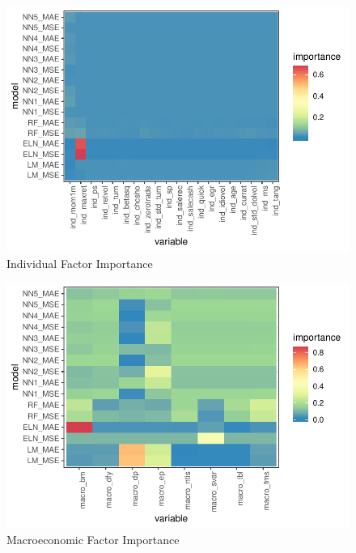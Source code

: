 \documentclass[11pt, a4paper, table]{article}
\begin{document}
\begin{figure}
	\includegraphics[]{../Results/empirical/empirical_all_sample_vi_ind.pdf}
	\caption{Individual Factor Importance}
\end{figure}

\begin{figure}
	\includegraphics[]{../Results/empirical/empirical_sample_all_vi_macro.pdf}
	\caption{Macroeconomic Factor Importance}
\end{figure}

\end{document}
